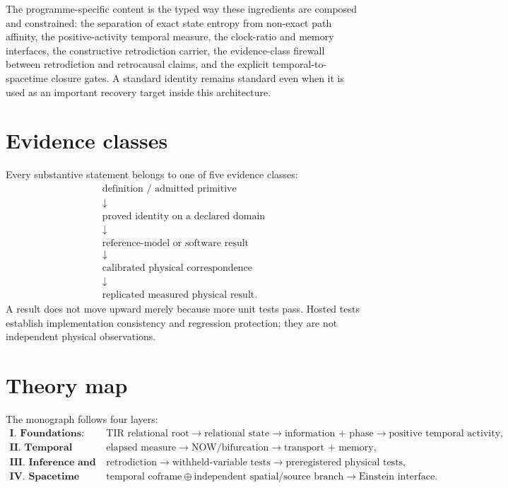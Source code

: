The programme-specific content is the typed way these ingredients are composed and constrained: the separation of exact state entropy from non-exact path affinity, the positive-activity temporal measure, the clock-ratio and memory interfaces, the constructive retrodiction carrier, the evidence-class firewall between retrodiction and retrocausal claims, and the explicit temporal-to-spacetime closure gates. A standard identity remains standard even when it is used as an important recovery target inside this architecture.

\section*{Evidence classes}

Every substantive statement belongs to one of five evidence classes:
\[
\boxed{
\begin{array}{c}
\text{definition / admitted primitive}\\
\downarrow\\
\text{proved identity on a declared domain}\\
\downarrow\\
\text{reference-model or software result}\\
\downarrow\\
\text{calibrated physical correspondence}\\
\downarrow\\
\text{replicated measured physical result}.
\end{array}}
\]
A result does not move upward merely because more unit tests pass. Hosted tests establish implementation consistency and regression protection; they are not independent physical observations.

\section*{Theory map}

The monograph follows four layers:
\[
\boxed{
\begin{aligned}
\textbf{I. Foundations:}\quad&
\text{TIR relational root}
\to
\text{relational state}
\to
\text{information + phase}
\to
\text{positive temporal activity},
\\[1mm]
\textbf{II. Temporal dynamics:}\quad&
\text{elapsed measure}
\to
\text{NOW/bifurcation}
\to
\text{transport + memory},
\\[1mm]
\textbf{III. Inference and experiment:}\quad&
\text{retrodiction}
\to
\text{withheld-variable tests}
\to
\text{preregistered physical tests},
\\[1mm]
\textbf{IV. Spacetime closure:}\quad&
\text{temporal coframe}
\oplus
\text{independent spatial/source branch}
\to
\text{Einstein interface}.
\end{aligned}}
\]

